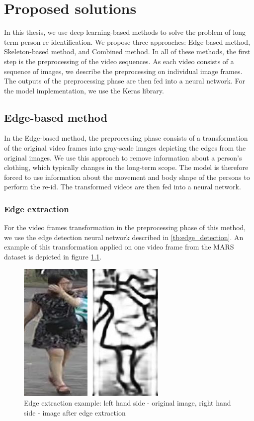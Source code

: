 \chapter{Proposed solutions} \label{ch:proposed_solutions}

In this thesis, we use deep learning-based methods to solve the problem of long term person re-identification. We propose three approaches: Edge-based method, Skeleton-based method, and Combined method. In all of these methods, the first step is the preprocessing of the video sequences. As each video consists of a sequence of images, we describe the preprocessing on individual image frames. The outputs of the preprocessing phase are then fed into a neural network. For the model implementation, we use the Keras library. 

\section{Edge-based method}

In the Edge-based method, the preprocessing phase consists of a transformation of the original video frames into gray-scale images depicting the edges from the original images. We use this approach to remove information about a person's clothing, which typically changes in the long-term scope. The model is therefore forced to use information about the movement and body shape of the persons to perform the re-id. The transformed videos are then fed into a neural network. 

\subsection{Edge extraction}
For the video frames transformation in the preprocessing phase of this method, we use the edge detection neural network described in  \ref{tb:edge_detection}. An example of this transformation applied on one video frame from the MARS dataset \cite{MARS} is depicted in figure \ref{fig:countour_extraction}.

\begin{figure}[h!]
    \centering
    \includegraphics[scale=0.4]{figures/contours_example.jpg}
    \caption{Edge extraction example: left hand side - original image, right hand side - image after edge extraction}
    \label{fig:countour_extraction}
\end{figure}

